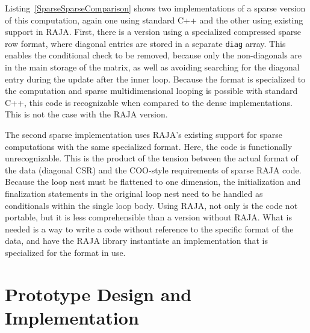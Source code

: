 Listing~\ref{SparseSparseComparison} shows two implementations of a sparse version of this computation, again one using standard C++ and the other using existing support in RAJA\@.
First, there is a version using a specialized compressed sparse row format, where diagonal entries are stored in a separate \verb.diag. array.
This enables the conditional check to be removed, because only the non-diagonals are in the main storage of the matrix, as well as avoiding searching for the diagonal entry during the update after the inner loop.
Because the format is specialized to the computation and sparse multidimensional looping is possible with standard C++, this code is recognizable when compared to the dense implementations.
This is not the case with the RAJA version.

The second sparse implementation uses RAJA's existing support for sparse computations with the same specialized format.
Here, the code is functionally unrecognizable.
This is the product of the tension between the actual format of the data (diagonal CSR) and the COO-style requirements of sparse RAJA code.
Because the loop nest must be flattened to one dimension, the initialization and finalization statements in the original loop nest need to be handled as conditionals within the single loop body.
Using RAJA, not only is the code not portable, but it is less comprehensible than a version without RAJA\@.
What is needed is a way to write a code without reference to the specific format of the data, and have the RAJA library instantiate an implementation that is specialized for the format in use.

\section{Prototype Design and Implementation}\label{sec:SparseRAJA}


